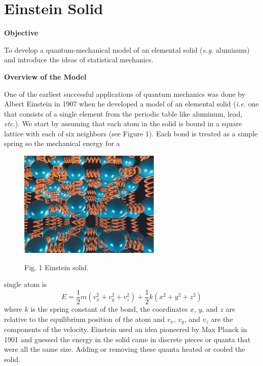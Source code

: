 \setcounter{page}{1}

\section{Einstein Solid}

\makelabheader %

\textbf{Objective}

To develop a quantum-mechanical model of an elemental solid ({\it e.g.} aluminum) and
introduce the ideas of statistical mechanics.

\textbf{Overview of the Model}

One of the earliest successful applications of quantum mechanics was done by Albert Einstein
in 1907 when he developed a model of an elemental solid ({\it i.e.} one that consists of a single
element from the periodic table like aluminum, lead, {\it etc.}).
We start by assuming that each atom in the solid is bound in a square lattice with each
of six neighbors (see Figure 1). Each bond is treated as a simple spring so the mechanical energy for a
\begin{figure}
\includegraphics[height=2.0in]{einstein_solid_picture2.eps}

\hfil Fig. 1 Einstein solid.\hfil 

\setcounter{figure}{1}

\end{figure}
single atom
is 
\begin{equation}
E = \frac{1}{2} m (v_x^2 + v_y^2 + v_z^2) + \frac{1}{2} k (x^2 + y^2 + z^2)
\end{equation}
where $k$ is the spring constant of the bond, the coordinates $x$, $y$, and $z$ are relative to the
equilibrium position of the atom and $v_x$, $v_y$, and $v_z$ are the components of the velocity.
Einstein used an idea pioneered by Max Planck in 1901 and
guessed the energy in the solid came in discrete pieces or quanta that were all
the same size.
Adding or removing these quanta heated or cooled the solid.
